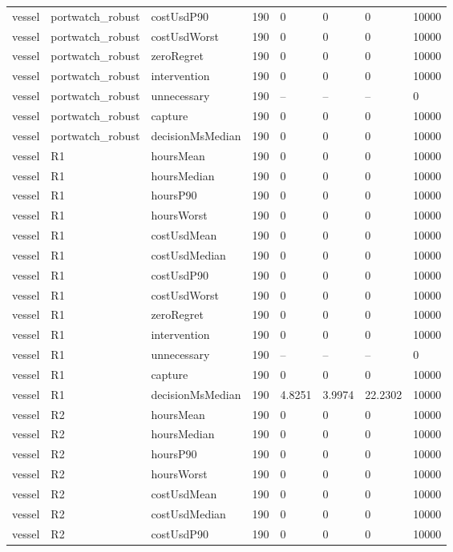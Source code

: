 \begin{tabular}{llllllll}
vessel & portwatch\_robust & costUsdP90 & 190 & 0 & 0 & 0 & 10000 \\
vessel & portwatch\_robust & costUsdWorst & 190 & 0 & 0 & 0 & 10000 \\
vessel & portwatch\_robust & zeroRegret & 190 & 0 & 0 & 0 & 10000 \\
vessel & portwatch\_robust & intervention & 190 & 0 & 0 & 0 & 10000 \\
vessel & portwatch\_robust & unnecessary & 190 & -- & -- & -- & 0 \\
vessel & portwatch\_robust & capture & 190 & 0 & 0 & 0 & 10000 \\
vessel & portwatch\_robust & decisionMsMedian & 190 & 0 & 0 & 0 & 10000 \\
vessel & R1 & hoursMean & 190 & 0 & 0 & 0 & 10000 \\
vessel & R1 & hoursMedian & 190 & 0 & 0 & 0 & 10000 \\
vessel & R1 & hoursP90 & 190 & 0 & 0 & 0 & 10000 \\
vessel & R1 & hoursWorst & 190 & 0 & 0 & 0 & 10000 \\
vessel & R1 & costUsdMean & 190 & 0 & 0 & 0 & 10000 \\
vessel & R1 & costUsdMedian & 190 & 0 & 0 & 0 & 10000 \\
vessel & R1 & costUsdP90 & 190 & 0 & 0 & 0 & 10000 \\
vessel & R1 & costUsdWorst & 190 & 0 & 0 & 0 & 10000 \\
vessel & R1 & zeroRegret & 190 & 0 & 0 & 0 & 10000 \\
vessel & R1 & intervention & 190 & 0 & 0 & 0 & 10000 \\
vessel & R1 & unnecessary & 190 & -- & -- & -- & 0 \\
vessel & R1 & capture & 190 & 0 & 0 & 0 & 10000 \\
vessel & R1 & decisionMsMedian & 190 & 4.8251 & 3.9974 & 22.2302 & 10000 \\
vessel & R2 & hoursMean & 190 & 0 & 0 & 0 & 10000 \\
vessel & R2 & hoursMedian & 190 & 0 & 0 & 0 & 10000 \\
vessel & R2 & hoursP90 & 190 & 0 & 0 & 0 & 10000 \\
vessel & R2 & hoursWorst & 190 & 0 & 0 & 0 & 10000 \\
vessel & R2 & costUsdMean & 190 & 0 & 0 & 0 & 10000 \\
vessel & R2 & costUsdMedian & 190 & 0 & 0 & 0 & 10000 \\
vessel & R2 & costUsdP90 & 190 & 0 & 0 & 0 & 10000 \\

\end{tabular}
